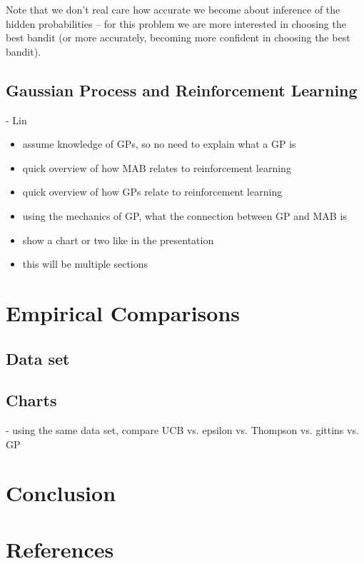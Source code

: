 \documentclass{article}
\begin{document}
Note that we don't real care how accurate we become about inference of the hidden probabilities -- for this problem we are more interested in choosing the best bandit (or more accurately, becoming more confident in choosing the best bandit).



\subsection{Gaussian Process and Reinforcement Learning}

- Lin
\begin{itemize}
\item assume knowledge of GPs, so no need to explain what a GP is
\item quick overview of how MAB relates to reinforcement learning
\item quick overview of how GPs relate to reinforcement learning
\item using the mechanics of GP, what the connection between GP and MAB is
\item show a chart or two like in the presentation
\item this will be multiple sections
\end{itemize}

\section{Empirical Comparisons}

\subsection{Data set}

\subsection{Charts}

- using the same data set, compare UCB vs. epsilon vs. Thompson vs. gittins vs. GP

\section{Conclusion}

\section{References}
\end{document}
